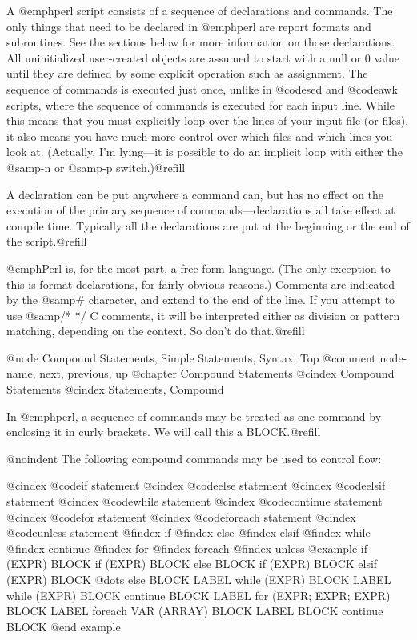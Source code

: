 {{{{{{A @emph{perl} script consists of a sequence of declarations and
commands.  The only things that need to be declared in @emph{perl} are
report formats and subroutines.  See the sections below for more
information on those declarations.  All uninitialized user-created
objects are assumed to start with a null or 0 value until they are
defined by some explicit operation such as assignment.  The sequence of
commands is executed just once, unlike in @code{sed} and @code{awk}
scripts, where the sequence of commands is executed for each input line.
While this means that you must explicitly loop over the lines of your
input file (or files), it also means you have much more control over
which files and which lines you look at.  (Actually, I'm lying---it is
possible to do an implicit loop with either the @samp{-n} or @samp{-p}
switch.)@refill

A declaration can be put anywhere a command can, but has no effect on
the execution of the primary sequence of commands---declarations all
take effect at compile time.  Typically all the declarations are put at
the beginning or the end of the script.@refill

@emph{Perl} is, for the most part, a free-form language.  (The only
exception to this is format declarations, for fairly obvious reasons.)
Comments are indicated by the @samp{#} character, and extend to the end
of the line.  If you attempt to use @samp{/* */} C comments, it will be
interpreted either as division or pattern matching, depending on the
context.  So don't do that.@refill

@node Compound Statements, Simple Statements, Syntax, Top
@comment  node-name,  next,  previous,  up
@chapter Compound Statements
@cindex Compound Statements
@cindex Statements, Compound

In @emph{perl}, a sequence of commands may be treated as one command by
enclosing it in curly brackets.  We will call this a BLOCK.@refill

@noindent
The following compound commands may be used to control flow:

@cindex @code{if} statement
@cindex @code{else} statement
@cindex @code{elsif} statement
@cindex @code{while} statement
@cindex @code{continue} statement
@cindex @code{for} statement
@cindex @code{foreach} statement
@cindex @code{unless} statement
@findex if
@findex else
@findex elsif
@findex while
@findex continue
@findex for
@findex foreach
@findex unless
@example
if (EXPR) BLOCK
if (EXPR) BLOCK else BLOCK
if (EXPR) BLOCK elsif (EXPR) BLOCK @dots{} else BLOCK
LABEL while (EXPR) BLOCK
LABEL while (EXPR) BLOCK continue BLOCK
LABEL for (EXPR; EXPR; EXPR) BLOCK
LABEL foreach VAR (ARRAY) BLOCK
LABEL BLOCK continue BLOCK
@end example

}}}}}}
